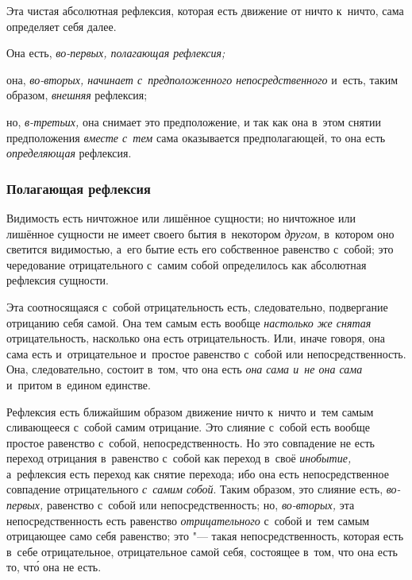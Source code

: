 Эта чистая абсолютная рефлексия, которая есть движение от ничто к~ничто,
сама определяет себя далее.

Она есть, {\em во-первых, полагающая рефлексия;}

она, {\em во-вторых, начинает с~предположенного непосредственного} и~есть,
таким образом, {\em внешняя} рефлексия;

но, {\em в-третьих,} она снимает это предположение, и
так как она в~этом снятии предположения {\em вместе с~тем}
сама оказывается предполагающей, то она есть {\em определяющая} рефлексия.

\subsubsection{Полагающая рефлексия}
Видимость есть ничтожное или лишённое сущности;
но ничтожное или лишённое сущности не имеет своего бытия в~некотором
{\em другом,} в~котором оно светится видимостью, а~его
бытие есть его собственное равенство с~собой; это чередование
отрицательного с~самим собой определилось как абсолютная рефлексия сущности.

Эта соотносящаяся с~собой отрицательность есть, следовательно, подвергание
отрицанию себя самой. Она тем самым есть вообще
{\em настолько же снятая} отрицательность, насколько
она есть отрицательность. Или, иначе говоря, она сама есть и~отрицательное
и~простое равенство с~собой или непосредственность. Она, следовательно,
состоит в~том, что она есть {\em она сама и~не она
сама} и~притом в~едином единстве.

Рефлексия есть ближайшим образом движение ничто к~ничто и~тем самым
сливающееся с~собой самим отрицание. Это слияние с~собой есть вообще
простое равенство с~собой, непосредственность. Но это совпадение не есть
переход отрицания в~равенство с~собой как переход в~своё
{\em инобытие,} а~рефлексия есть переход как снятие
перехода; ибо она есть непосредственное совпадение отрицательного
{\em с~самим собой}. Таким образом, это слияние есть,
{\em во-первых,} равенство с~собой или
непосредственность; но, {\em во-вторых,} эта
непосредственность есть равенство {\em отрицательного}
с~собой и~тем самым отрицающее само себя равенство; это "--- такая
непосредственность, которая есть в~себе отрицательное, отрицательное самой
себя, состоящее в~том, что она есть то, чт\'{о} она не есть.

